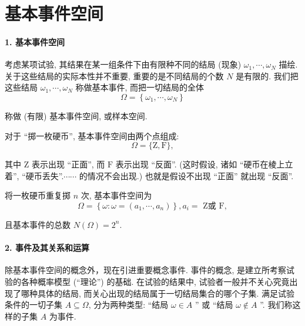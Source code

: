 \section{基本事件空间}
\paragraph{1. 基本事件空间}  考虑某项试验, 其结果在某一组条件下由有限种不同的结局 (现象) $\omega_1, \cdots, \omega_N$ 描绘. 关于这些结局的实际本性并不重要, 重要的是不同结局的个数 $N$ 是有限的. 我们把这些结局 $\omega_1, \cdots, \omega_N$ 称做基本事件, 而把一切结局的全体
$$
\Omega=\left\{\omega_1, \cdots, \omega_N\right\}
$$

称做 (有限) 基本事件空间, 或样本空间.

\begin{example}
    对于 “掷一枚硬币”, 基本事件空间由两个点组成:
$$
\Omega=\{\mathrm{Z}, \mathrm{F}\},
$$

其中 Z 表示出现 “正面”, 而 $\mathrm{F}$ 表示出现 “反面”. (这时假设, 诸如 “硬币在棱上立着”, “硬币丢失”.$\cdots \cdots$ 的情况不会出现.) 也就是假设不出现 “正面” 就出现 “反面”.

    将一枚硬币重复掷 $n$ 次, 基本事件空间为
$$
\Omega=\left\{\omega: \omega=\left(a_1, \cdots, a_n\right)\right\}, a_i=\text { Z或 } \mathrm{F},
$$

且基本事件的总数 $N(\Omega)=2^n$.
\end{example}

\paragraph{2. 事件及其关系和运算} 除基本事件空间的概念外，现在引进重要概念事件. 事件的概念, 是建立所考察试验的各种概率模型 (“理论”) 的基础. 在试验的结果中, 试验者一般并不关心究竟出现了哪种具体的结局, 而关心出现的结局属于一切结局集合的哪个子集. 满足试验条件的一切子集 $A \subseteq \Omega$, 分为两种类型: “结局 $\omega \in A$ ” 或 “结局 $\omega \notin A$ ”. 我们称这样的子集 $A$ 为事件.
